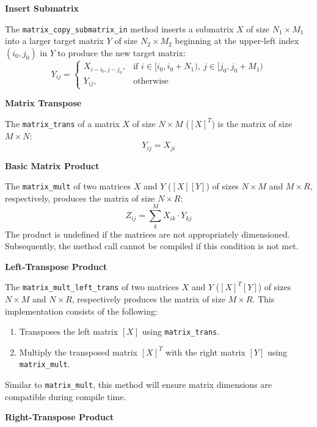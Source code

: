 \documentclass[11pt,fleqn]{report}
\begin{document}
\textbf{Insert Submatrix}

The \texttt{matrix\_copy\_submatrix\_in} method inserts a submatrix $X$ of size
$N_1 \times M_1$ into a larger target matrix $Y$ of size 
$N_2 \times M_2$ beginning at the upper-left index $(i_0,j_0)$ in $Y$ to produce
the new target matrix:
\begin{equation*} 
Y_{ij} = 
\begin{cases} 
X_{i - i_0, j - j_0}, & \text{if } i \in [i_0, i_0 + N_1),~ j \in [j_0, j_0 + M_1) \\ 
Y_{ij}, & \text{otherwise} 
\end{cases} 
\end{equation*}

\textbf{Matrix Transpose}

The \texttt{matrix\_trans} of a matrix $X$ of size $N \times M$ ($[X]^T$)
is the matrix of size $M \times N$:
\begin{equation*}
Y_{ij} = X_{ji}
\end{equation*}

\textbf{Basic Matrix Product}

The \texttt{matrix\_mult} of two matrices $X$ and $Y$ ($[X][Y]$) of sizes $N \times M$ and
$M \times R$, respectively, produces the matrix of size $N \times R$:
\begin{equation*}
Z_{ij} = \sum_k^M X_{ik} \cdot Y_{kj}
\end{equation*}
The product is undefined if the matrices are not appropriately
dimensioned. Subsequently, the method call cannot be compiled if this condition 
is not met.

\textbf{Left-Transpose Product}

The \texttt{matrix\_mult\_left\_trans} of two matrices $X$ and $Y$ ($[X]^T[Y]$) 
of sizes $N \times M$ and
$N \times R$, respectively produces the matrix of size $M \times R$. 
This implementation consists of the following:
\begin{enumerate}
\item Transposes the left matrix $[X]$ using \texttt{matrix\_trans}.
\item Multiply the transposed matrix $[X]^T$ with the right matrix $[Y]$ using 
\texttt{matrix\_mult}.
\end{enumerate}
Similar to \texttt{matrix\_mult}, this method will ensure matrix dimensions are
compatible during compile time.

\textbf{Right-Transpose Product}
\end{document}
